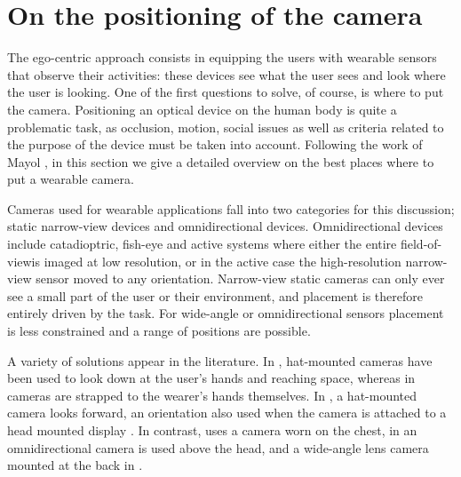 \section{On the positioning of the camera}
The ego-centric approach consists in equipping the users with wearable sensors that observe their activities: these devices see what the user sees and look where the user is looking. One of the first questions to solve, of course, is where to put the camera. Positioning an optical device on the human body is quite a problematic task, as occlusion, motion, social issues as well as criteria related to the purpose of the device must be taken into account. Following the work of Mayol \etal \cite{mayol2001positioning}, in this section we give a detailed overview on the best places where to put a wearable camera.

Cameras used for wearable applications fall into two categories for this discussion; static narrow-view devices and omnidirectional devices. Omnidirectional devices include catadioptric, fish-eye and active systems where either the entire field-of-viewis imaged at low resolution, or in the active case the high-resolution narrow-view sensor moved to any orientation. Narrow-view static cameras can only ever see a small part of the user or their environment, and placement is therefore entirely driven by the task. For wide-angle or omnidirectional sensors placement is less constrained and a range of positions are possible. 

A variety of solutions appear in the literature. In \cite{starner1998real, schiele1999attentional}, hat-mounted cameras have been used to look down at the user’s hands and reaching space, whereas in \cite{kohtake1999infostick} cameras are strapped to the wearer’s hands themselves. In \cite{aoki1999realtime}, a hat-mounted camera looks forward, an orientation also used when the camera is attached to a head mounted display \cite{mann1998wearcam}. In contrast, \cite{starner2000gesture} uses a camera worn on the chest, in \cite{rungsarityotin2000finding} an omnidirectional camera is used above the head, and a wide-angle lens camera mounted at the back in \cite{clarkson1999unsupervised}.

